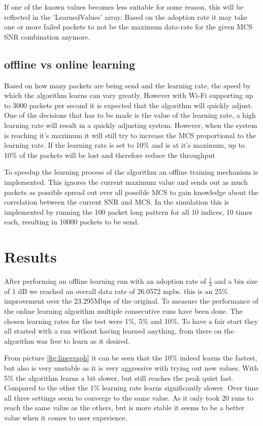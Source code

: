 \documentclass[conference,compsoc]{IEEEtran}
\begin{document}
If one of the known values becomes less suitable for some reason, this will be reflected in the 'LearnedValues' array. Based on the adoption rate it may take one or more failed packets to not be the maximum data-rate for the given MCS SNR combination anymore. 

\subsection{offline vs online learning}
Based on how many packets are being send and the learning rate, the speed by which the algorithm learns can vary greatly. However with Wi-Fi supporting up to 3000 packets per second \cite{3kPackets} it is expected that the algorithm will quickly adjust. One of the decisions that has to be made is the value of the learning rate, a high learning rate will result in a quickly adjusting system. However, when the system is reaching it's maximum it will still try to increase the MCS proportional to the learning rate. If the learning rate is set to 10\% and is at it's maximum, up to 10\% of the packets will be lost and therefore reduce the throughput

To speedup the learning process of the algorithm an offline training mechanism is implemented. This ignores the current maximum value and sends out as much packets as possible spread out over all possible MCS to gain knowledge about the correlation between the current SNR and MCS. In the simulation this is implemented by running the 100 packet long pattern for all 10 indices, 10 times each, resulting in 10000 packets to be send.

\section{Results}
After performing an offline learning run with an adoption rate of $\frac{1}{3}$ and a bin size of 1 dB we reached an overall data rate of 26.0572 mpbs. this is an 25\% improvement over the 23.295Mbps of the original.
To measure the performance of the online learning algorithm multiple consecutive runs have been done. The chosen learning rates for the test were 1\%, 5\% and 10\%. To have a fair start they all started with a run without having learned anything, from there on the algorithm was free to learn as it desired.

From picture \ref{fig:linegraph} it can be seen that the 10\% indeed learns the fastest, but also is very unstable as it is very aggressive with trying out new values. With 5\% the algorithm learns a bit slower, but still reaches the peak quiet fast. Compared to the other the 1\% learning rate learns significantly slower. Over time all three settings seem to converge to the same value. As it only took 20 runs to reach the same value as the others, but is more stable it seems to be a better value when it comes to user experience.
\end{document}

